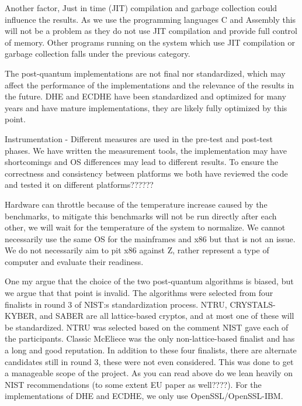 Another factor, Just in time (JIT) compilation and garbage collection could influence the results. As we use the programming languages C and Assembly this will not be a problem as they do not use JIT compilation and provide full control of memory. Other programs running on the system which use JIT compilation or garbage collection falls under the previous category.





The post-quantum implementations are not final nor standardized, which may affect the performance of the implementations and the relevance of the results in the future. DHE and ECDHE have been standardized and optimized for many years and have mature implementations, they are likely fully optimized by this point.

Instrumentation - Different measures are used in the pre-test and post-test phases.
We have written the measurement tools, the implementation may have shortcomings and OS differences may lead to different results. To ensure the correctness and consistency between platforms we both have reviewed the code and tested it on different platforms??????

Hardware can throttle because of the temperature increase caused 
by the benchmarks, to mitigate this benchmarks will not be run directly after each other, we will wait for the temperature of the system to normalize.
We cannot necessarily use the same OS for the mainframes and x86 but that is not an issue. We do not necessarily aim to pit x86 against Z, rather represent a type of computer and evaluate their readiness.

One my argue that the choice of the two post-quantum algorithms is biased, but we argue that that point is invalid. The algorithms were selected from four finalists in round 3 of NIST:s standardization process. NTRU, CRYSTALS-KYBER, and SABER are all lattice-based cryptos, and at most one of these will be standardized. NTRU was selected based on the comment NIST gave each of the participants. Classic McEliece was the only non-lattice-based finalist and has a long and good reputation. In addition to these four finalists, there are alternate candidates still in round 3, these were not even considered. This was done to get a manageable scope of the project. As you can read above do we lean heavily on NIST recommendations (to some extent EU paper as well????). For the implementations of DHE and ECDHE, we only use OpenSSL/OpenSSL-IBM.

